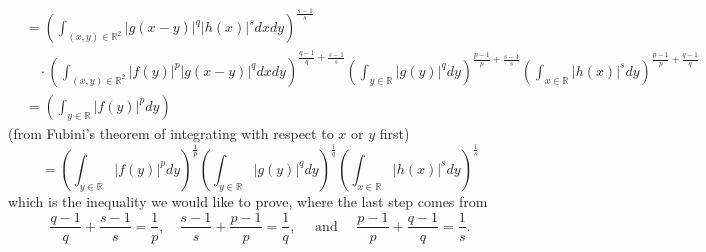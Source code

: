 \documentclass[12pt, a4paper, oneside]{book}
\begin{document}
\begin{theorem}[Young's]
\begin{equation*}
\begin{aligned}
                 & =\left(\int_{(x, y) \in \mathbb{R}^2}|g(x-y)|^q|h(x)|^s d x d y\right)^{\frac{s-1}{s}}                                                                                                                                                                                     \\
                 & \quad \cdot\left(\int_{(x, y) \in \mathbb{R}^2}|f(y)|^p|g(x-y)|^q d x d y\right)^{\frac{q-1}{q}+\frac{s-1}{s}}\left(\int_{y \in \mathbb{R}}|g(y)|^q d y\right)^{\frac{p-1}{p}+\frac{s-1}{s}}\left(\int_{x \in \mathbb{R}}|h(x)|^s d y\right)^{\frac{p-1}{p}+\frac{q-1}{q}} \\
                 & =\left(\int_{y \in \mathbb{R}}|f(y)|^p d y\right)
        \end{aligned}
    \end{equation*}
    (from Fubini's theorem of integrating with respect to $x$ or $y$ first)
    \begin{equation*}
        =\left(\int_{y \in \mathbb{R}}|f(y)|^p d y\right)^{\frac{1}{p}}\left(\int_{y \in \mathbb{R}}|g(y)|^q d y\right)^{\frac{1}{q}}\left(\int_{x \in \mathbb{R}}|h(x)|^s d y\right)^{\frac{1}{s}}
    \end{equation*}
    which is the inequality we would like to prove, where the last step comes from
    \begin{equation*}
        \frac{q-1}{q}+\frac{s-1}{s}=\frac{1}{p}, \quad \frac{s-1}{s}+\frac{p-1}{p}=\frac{1}{q}, \quad \text { and } \quad \frac{p-1}{p}+\frac{q-1}{q}=\frac{1}{s} .
    \end{equation*}




\end{theorem}
\end{document}
